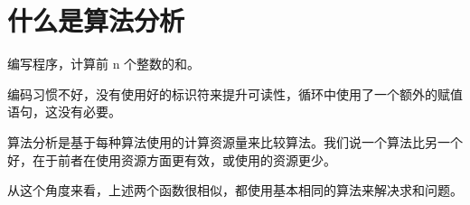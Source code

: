\section{什么是算法分析}


\begin{frame}\ft{\secname}
\begin{wenti}
	编写程序，计算前 n 个整数的和。
\end{wenti} \pause 


\end{frame}


\begin{frame}
 \pause 
 
编码习惯不好，没有使用好的标识符来提升可读性，循环中使用了一个额外的赋值语句，这没有必要。

\end{frame}


\begin{frame}
算法分析是基于每种算法使用的计算资源量来比较算法。我们说一个算法比另一个好，在于前者在使用资源方面更有效，或使用的资源更少。

从这个角度来看，上述两个函数很相似，都使用基本相同的算法来解决求和问题。

\end{frame}


